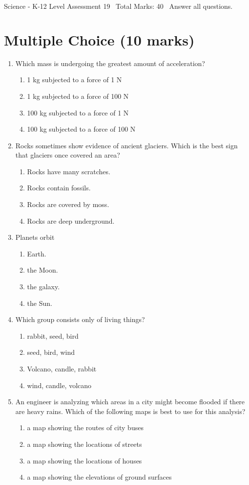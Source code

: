 \documentclass[12pt]{article}
\begin{document}
\begin{center}
Science - K-12 Level Assessment 19 \
Total Marks: 40 \
Answer all questions.
\end{center}

\section*{Multiple Choice (10 marks)}
\begin{enumerate}[label=\arabic*.]
\item Which mass is undergoing the greatest amount of acceleration?
\begin{enumerate}[label=(\alph*)]
    \item 1 kg subjected to a force of 1 N
    \item 1 kg subjected to a force of 100 N
    \item 100 kg subjected to a force of 1 N
    \item 100 kg subjected to a force of 100 N
\end{enumerate}
\item Rocks sometimes show evidence of ancient glaciers. Which is the best sign that glaciers once covered an area?
\begin{enumerate}[label=(\alph*)]
    \item Rocks have many scratches.
    \item Rocks contain fossils.
    \item Rocks are covered by moss.
    \item Rocks are deep underground.
\end{enumerate}
\item Planets orbit
\begin{enumerate}[label=(\alph*)]
    \item Earth.
    \item the Moon.
    \item the galaxy.
    \item the Sun.
\end{enumerate}
\item Which group consists only of living things?
\begin{enumerate}[label=(\alph*)]
    \item rabbit, seed, bird
    \item seed, bird, wind
    \item Volcano, candle, rabbit
    \item wind, candle, volcano
\end{enumerate}
\item An engineer is analyzing which areas in a city might become flooded if there are heavy rains. Which of the following maps is best to use for this analysis?
\begin{enumerate}[label=(\alph*)]
    \item a map showing the routes of city buses
    \item a map showing the locations of streets
    \item a map showing the locations of houses
    \item a map showing the elevations of ground surfaces
\end{enumerate}
\end{enumerate}
\end{document}
